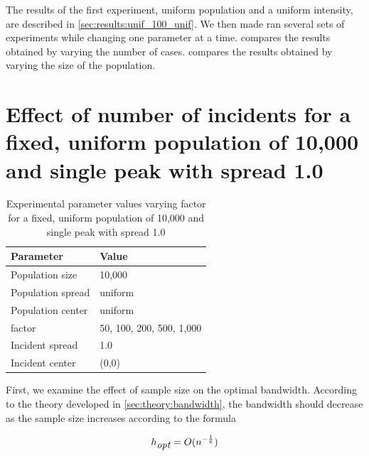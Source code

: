 The results of the first experiment, uniform population and a uniform intensity,
are described in \cref{sec:results:unif_100_unif}.
We then made ran several sets of experiments while changing one parameter at a time.
 compares the results obtained by varying the number of cases.
 compares the results obtained by varying the size of the population.

\section[Effect of number of incidents with fixed population]
    {Effect of number of incidents for a fixed, uniform population of 10,000 and single peak with spread 1.0}
\label{sec:results:number_of_incidents}

\begin{table}[htbp]
\centering
\begin{tabular}{ll}
\hline
Parameter & Value \\
\hline
Population size & 10,000 \\
Population \gls{spread} & uniform \\
Population center & uniform \\
\Gls{factor} & 50, 100, 200, 500, 1,000 \\
Incident \gls{spread} & 1.0 \\
Incident center & (0,0) \\
\hline
\end{tabular}
\caption[Effect of number of incidents with fixed population]
    {Experimental parameter values varying \gls{factor} for a fixed, uniform population of 10,000 and single peak with spread 1.0}
\label{tab:params:results:number_of_incidents}
\end{table}

First, we examine the effect of sample size on the optimal bandwidth.
According to the theory developed in \cref{sec:theory:bandwidth},
the bandwidth should decrease as the sample size increases according to the formula

\[
    h_{\mbox{\itshape opt}} = O(n^{-\frac{1}{6}})
\]


